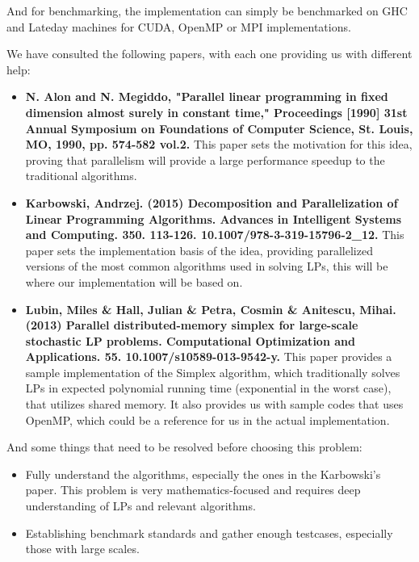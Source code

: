 \documentclass[11pt]{article}
\begin{document}
	And for benchmarking, the implementation can simply be benchmarked on GHC and Lateday machines for CUDA, OpenMP or MPI implementations.
	
	We have consulted the following papers, with each one providing us with different help:
	\begin{itemize}
		\item \textbf{N. Alon and N. Megiddo, "Parallel linear programming in fixed dimension almost surely in constant time," Proceedings [1990] 31st Annual Symposium on Foundations of Computer Science, St. Louis, MO, 1990, pp. 574-582 vol.2.} This paper sets the motivation for this idea, proving that parallelism will provide a large performance speedup to the traditional algorithms.
		\item \textbf{Karbowski, Andrzej. (2015) Decomposition and Parallelization of Linear Programming Algorithms. Advances in Intelligent Systems and Computing. 350. 113-126. 10.1007/978-3-319-15796-2\_12. } This paper sets the implementation basis of the idea, providing parallelized versions of the most common algorithms used in solving LPs, this will be where our implementation will be based on.
		\item \textbf{Lubin, Miles \& Hall, Julian \& Petra, Cosmin \& Anitescu, Mihai. (2013) Parallel distributed-memory simplex for large-scale stochastic LP problems. Computational Optimization and Applications. 55. 10.1007/s10589-013-9542-y. } This paper provides a sample implementation of the Simplex algorithm, which traditionally solves LPs in expected polynomial running time (exponential in the worst case), that utilizes shared memory. It also provides us with sample codes that uses OpenMP, which could be a reference for us in the actual implementation.
	\end{itemize}
	And some things that need to be resolved before choosing this problem:
	\begin{itemize}
		\item Fully understand the algorithms, especially the ones in the Karbowski's paper. This problem is very mathematics-focused and requires deep understanding of LPs and relevant algorithms.
		\item Establishing benchmark standards and gather enough testcases, especially those with large scales.
	\end{itemize}
\end{document}

